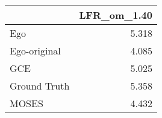 \begin{tabular}{lr}
\toprule
{} & LFR_om_1.40 \\
\midrule
Ego          &       5.318 \\
Ego-original &       4.085 \\
GCE          &       5.025 \\
Ground Truth &       5.358 \\
MOSES        &       4.432 \\
\bottomrule
\end{tabular}
